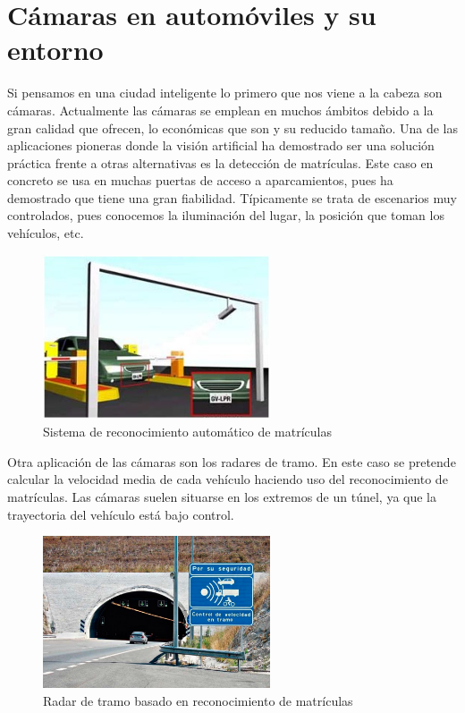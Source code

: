 \section{Cámaras en automóviles y su entorno}

Si pensamos en una ciudad inteligente lo primero que nos viene a la cabeza son cámaras. Actualmente las cámaras se emplean en muchos ámbitos debido a la gran calidad que ofrecen, lo económicas que son y su reducido tamaño. Una de las aplicaciones pioneras donde la visión artificial ha demostrado ser una solución práctica frente a otras alternativas es la detección de matrículas. Este caso en concreto se usa en muchas puertas de acceso a aparcamientos, pues ha demostrado que tiene una gran fiabilidad.  Típicamente se trata de escenarios muy controlados, pues conocemos la iluminación del lugar, la posición que toman los vehículos, etc. 

\begin{figure}[H]
  \begin{center}
    \includegraphics[width=0.6\textwidth]{figures/Introduccion/reconocimiento_matriculas.jpeg}
		\caption{Sistema de reconocimiento automático de matrículas}
		\label{fig.reconocimiento_matriculas}
		\end{center}
\end{figure}

Otra aplicación de las cámaras son los radares de tramo. En este caso se pretende calcular la velocidad media de cada vehículo haciendo uso del reconocimiento de matrículas. Las cámaras suelen situarse en los extremos de un túnel, ya que la trayectoria del vehículo está bajo control.

\begin{figure}[H]
  \begin{center}
    \includegraphics[width=0.6\textwidth]{figures/Introduccion/radartramo.jpg}
		\caption{Radar de tramo basado en reconocimiento de matrículas}
		\label{fig.radartramo}
		\end{center}
\end{figure}

